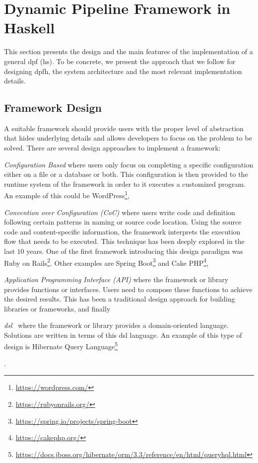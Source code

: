 \section{Dynamic Pipeline Framework in Haskell}\label{dp-hs}
This section presents the design and the main features of the implementation of a general \acrlong{dpf} (\acrshort{hs}).  To be concrete, we present the approach that we follow for designing \acrshort{dpfh}, the system architecture and the  most relevant implementation details.

\subsection{Framework Design}
A suitable framework should provide users with the proper level of abstraction that hides underlying details and allows developers to focus on the problem to be solved. 
%
\iffalse
There are several design approaches to implement a framework: \begin{inparaenum}[i\upshape)]
  \item  \emph{Configuration Based} where users only focus on completing a specific configuration either on a file or a database or both. This configuration is then provided to the runtime system of the framework in order to it executes a customized  program. An example of this could be WordPress\footnote{\url{https://wordpress.com/}}, 
  \item  \emph{Convention over Configuration (CoC)} where users write code and definition following certain patterns in naming or source code location. Using the source code and content-specific information, the framework interprets the execution flow that needs to be executed. This technique has been deeply explored in the last $10$ years. One of the first framework introducing this design paradigm was Ruby on Rails\footnote{\url{https://rubyonrails.org/}}. Other examples are Spring Boot\footnote{\url{https://spring.io/projects/spring-boot}} and Cake PHP\footnote{\url{https://cakephp.org/}},
  \item \emph{Application Programming Interface (API)} where the framework or library provides functions or interfaces. Users need to compose these functions to achieve the desired results. This has been a traditional design approach for building  libraries or frameworks, and finally
  \item \emph{\acrfull{dsl}}~\cite{Fowler10} where the framework or library provides a domain-oriented language. Solutions are written in terms of this \acrshort{dsl} language. An example of this type of design is Hibernate Query Language\footnote{\url{https://docs.jboss.org/hibernate/orm/3.3/reference/en/html/queryhql.html}}
   \end{inparaenum}.
